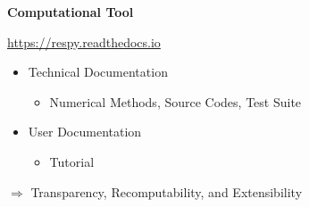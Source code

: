 \begin{frame}

\textbf{Computational Tool}

\begin{center}
\url{https://respy.readthedocs.io}
\end{center}

\begin{itemize}\setlength\itemsep{1em}
\item Technical Documentation\medskip
\begin{itemize}\setlength\itemsep{1em}
\item Numerical Methods, Source Codes, Test Suite
\end{itemize}
\item User Documentation\medskip
\begin{itemize}\setlength\itemsep{1em}
\item Tutorial
\end{itemize}
\end{itemize}\medskip
$\Rightarrow$ Transparency, Recomputability, and Extensibility
\end{frame}
